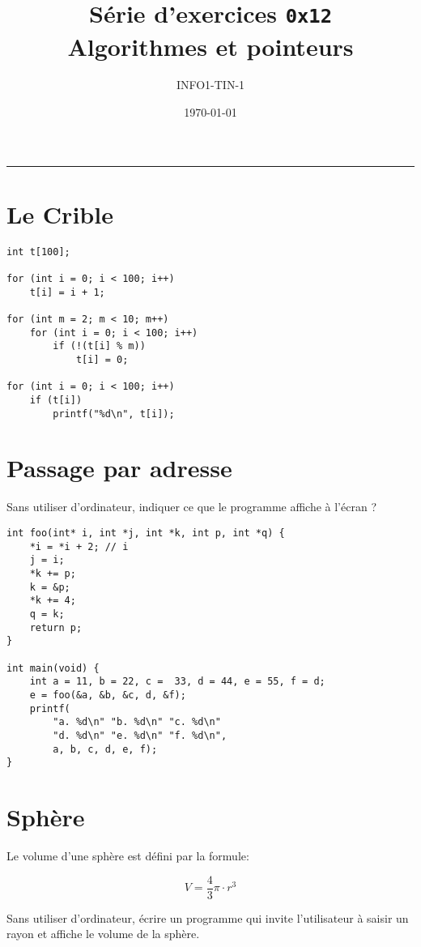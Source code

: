 



\date{\today}
\author{INFO1-TIN-1}
\title{Série d'exercices \texttt{0x12} \\ \textbf{Algorithmes et pointeurs}}
\maketitle

\noindent\rule{\textwidth}{.3pt}


\section{Le Crible}

\begin{lstlisting}
int t[100];

for (int i = 0; i < 100; i++)
    t[i] = i + 1;

for (int m = 2; m < 10; m++)
    for (int i = 0; i < 100; i++)
        if (!(t[i] % m))
            t[i] = 0;

for (int i = 0; i < 100; i++)
    if (t[i])
        printf("%d\n", t[i]);
\end{lstlisting}

\section{Passage par adresse}

Sans utiliser d'ordinateur, indiquer ce que le programme affiche à l'écran ?

\begin{lstlisting}
int foo(int* i, int *j, int *k, int p, int *q) {
    *i = *i + 2; // i
    j = i;
    *k += p;
    k = &p;
    *k += 4;
    q = k;
    return p;
}

int main(void) {
    int a = 11, b = 22, c =  33, d = 44, e = 55, f = d;
    e = foo(&a, &b, &c, d, &f);
    printf(
        "a. %d\n" "b. %d\n" "c. %d\n"
        "d. %d\n" "e. %d\n" "f. %d\n",
        a, b, c, d, e, f);
}
\end{lstlisting}

\section{Sphère}

Le volume d'une sphère est défini par la formule:

\[V = \frac{4}{3}\pi\cdot r^3\]

Sans utiliser d'ordinateur, écrire un programme qui invite l'utilisateur à saisir un rayon et affiche le volume de la sphère.



